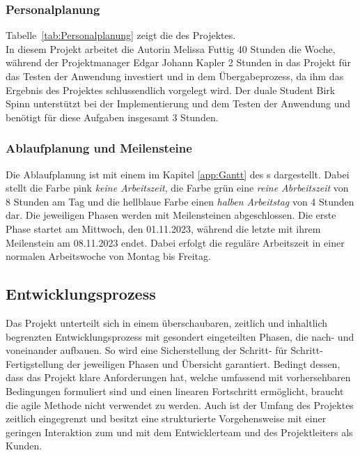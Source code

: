 \subsubsection{Personalplanung}
\label{sec:Personalplanung}
Tabelle~\ref{tab:Personalplanung} zeigt die  des Projektes.
\\
In diesem Projekt arbeitet die Autorin Melissa Futtig 40 Stunden die Woche, während der Projektmanager 
Edgar Johann Kapler 2 Stunden in das Projekt für das Testen der Anwendung investiert und in dem 
Übergabeprozess, da ihm das Ergebnis des Projektes schlussendlich vorgelegt wird. Der duale Student 
Birk Spinn unterstützt bei der Implementierung und dem Testen der Anwendung und benötigt für diese 
Aufgaben insgesamt 3 Stunden.

\subsubsection{Ablaufplanung und Meilensteine}
\label{sec:Ablaufplaung und Meilensteine}
Die Ablaufplanung ist mit einem  im Kapitel \ref{app:Gantt} des s dargestellt. 
Dabei stellt die Farbe pink \textit{keine Arbeitszeit}, die Farbe grün eine \textit{reine Abrbeitszeit} 
von 8 Stunden am Tag und die hellblaue Farbe einen \textit{halben Arbeitstag} von 4 Stunden dar. Die jeweiligen Phasen 
werden mit Meilensteinen abgeschlossen. Die erste Phase startet am Mittwoch, den 01.11.2023, während die letzte 
mit ihrem Meilenstein am 08.11.2023 endet. Dabei erfolgt die reguläre Arbeitszeit in einer normalen Arbeitswoche 
von Montag bis Freitag.

\subsection{Entwicklungsprozess}
\label{sec:Entwicklungsprozess}
Das Projekt unterteilt sich in einem überschaubaren, zeitlich und inhaltlich begrenzten Entwicklungsprozess 
mit gesondert eingeteilten Phasen, die nach- und voneinander aufbauen. So wird eine Sicherstellung der Schritt- 
für Schritt-Fertigstellung der jeweiligen Phasen und Übersicht garantiert. Bedingt dessen, dass das Projekt klare Anforderungen 
hat, welche umfassend mit vorhersehbaren Bedingungen formuliert sind und einen linearen Fortschritt ermöglicht, braucht 
die agile Methode nicht verwendet zu werden. Auch ist der Umfang des Projektes zeitlich eingegrenzt und besitzt eine 
strukturierte Vorgehensweise mit einer geringen Interaktion zum und mit dem Entwicklerteam und des Projektleiters als Kunden.

